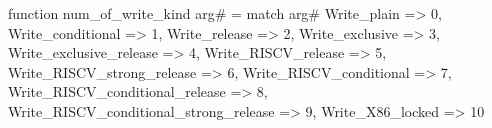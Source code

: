 function num_of_write_kind arg# = match arg# {
  Write_plain => 0,
  Write_conditional => 1,
  Write_release => 2,
  Write_exclusive => 3,
  Write_exclusive_release => 4,
  Write_RISCV_release => 5,
  Write_RISCV_strong_release => 6,
  Write_RISCV_conditional => 7,
  Write_RISCV_conditional_release => 8,
  Write_RISCV_conditional_strong_release => 9,
  Write_X86_locked => 10
}

